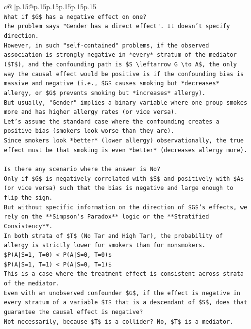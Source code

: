 \documentclass{article}
\begin{document}
{\begin{supertabular}{c@{$\;$}|p{.15\linewidth}@{}p{.15\linewidth}p{.15\linewidth}p{.15\linewidth}p{.15\linewidth}p{.15\linewidth}}
{{{\\ 
\texttt{What if \$G\$ has a negative effect on one?} \\
\texttt{The problem says "Gender has a direct effect". It doesn't specify direction.} \\
\texttt{However, in such "self{-}contained" problems, if the observed association is strongly negative in *every* stratum of the mediator (\$T\$), and the confounding path is \$S \textbackslash{}leftarrow G \textbackslash{}to A\$, the only way the causal effect would be positive is if the confounding bias is massive and negative (i.e., \$G\$ causes smoking but *decreases* allergy, or \$G\$ prevents smoking but *increases* allergy).} \\
\texttt{But usually, "Gender" implies a binary variable where one group smokes more and has higher allergy rates (or vice versa).} \\
\texttt{Let's assume the standard case where the confounding creates a positive bias (smokers look worse than they are).} \\
\texttt{Since smokers look *better* (lower allergy) observationally, the true effect must be that smoking is even *better* (decreases allergy more).} \\
\\ 
\texttt{Is there any scenario where the answer is No?} \\
\texttt{Only if \$G\$ is negatively correlated with \$S\$ and positively with \$A\$ (or vice versa) such that the bias is negative and large enough to flip the sign.} \\
\texttt{But without specific information on the direction of \$G\$'s effects, we rely on the **Simpson's Paradox** logic or the **Stratified Consistency**.} \\
\texttt{In both strata of \$T\$ (No Tar and High Tar), the probability of allergy is strictly lower for smokers than for nonsmokers.} \\
\texttt{\$P(A|S=1, T=0) < P(A|S=0, T=0)\$} \\
\texttt{\$P(A|S=1, T=1) < P(A|S=0, T=1)\$} \\
\texttt{This is a case where the treatment effect is consistent across strata of the mediator.} \\
\texttt{Even with an unobserved confounder \$G\$, if the effect is negative in every stratum of a variable \$T\$ that is a descendant of \$S\$, does that guarantee the causal effect is negative?} \\
\texttt{Not necessarily, because \$T\$ is a collider? No, \$T\$ is a mediator.} \\
}}}
\end{supertabular}}
\end{document}
